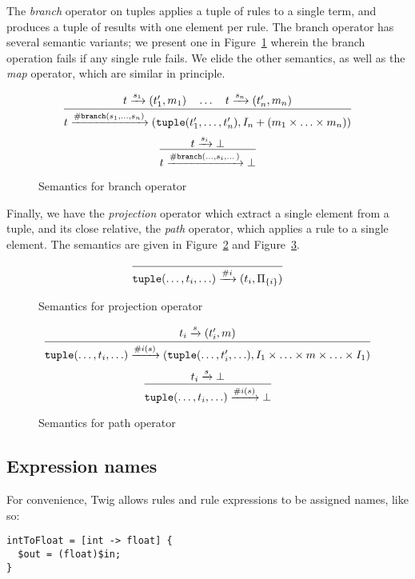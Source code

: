 The \emph{branch} operator on tuples applies a tuple of rules to a single term, and produces a tuple of results with one element per rule. The branch operator has several semantic variants; we present one in Figure~\ref{fig:branch} wherein the branch operation fails if any single rule fails. We elide the other semantics, as well as the \emph{map} operator, which are similar in principle.

\begin{figure}[ht]
\label{fig:branch}
\[
\infer
  {t \arr{\mathtt{\#branch}(s_1,\ldots,s_n)} (\mathtt{tuple}(t_1',\ldots,t_n'),I_n + (m_1 \times \ldots \times m_n))}
  {t \arr{s_1} (t_1',m_1) \quad \ldots \quad t \arr{s_n} (t_n',m_n)}
\]
\[
\infer
  {t \arr{\mathtt{\#branch}(\ldots,s_i,\dots)} \bot}
  {t \arr{s_i} \bot}
\]
\caption{Semantics for branch operator}
\end{figure}

Finally, we have the \emph{projection} operator which extract a single element from a tuple, and its close relative, the \emph{path} operator, which applies a rule to a single element. The semantics are given in Figure~\ref{fig:projection} and Figure~\ref{fig:path}.

\begin{figure}[ht]
\label{fig:projection}
\[
\infer
  {\mathtt{tuple}(\ldots,t_i,\ldots) \arr{\#i} (t_i,\Pi_{\{i\}})}
  {}
\]
\caption{Semantics for projection operator}
\end{figure}


\begin{figure}[ht]
\label{fig:path}
\[
\infer
  {\mathtt{tuple}(\ldots,t_i,\ldots) \arr{\#i(s)} (\mathtt{tuple}(\ldots,t_i',\ldots), I_1 \times \ldots \times m \times \ldots \times I_1)}
  {t_i \arr{s} (t_i',m)}
\]
\[
\infer
  {\mathtt{tuple}(\ldots,t_i,\ldots) \arr{\#i(s)} \bot}
  {t_i \arr{s} \bot}
\]
\caption{Semantics for path operator}
\end{figure}

\subsection{Expression names}
\label{section:names}

For convenience, Twig allows rules and rule expressions to be assigned names, like so:

\begin{verbatim}
intToFloat = [int -> float] {
  $out = (float)$in;
}
\end{verbatim}

